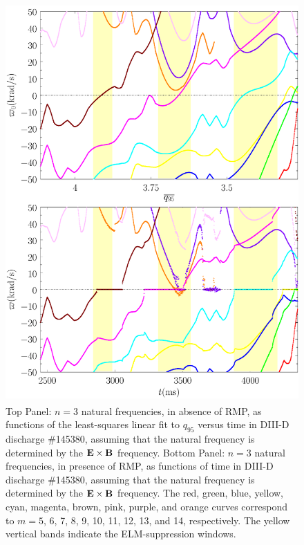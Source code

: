 \documentclass[12pt,prb,aps]{revtex4-1}
\begin{document}
\begin{figure}
\includegraphics[height=6in]{fig8.pdf}
\caption{Top Panel: $n=3$ natural frequencies, in absence of RMP, as functions of the least-squares linear fit to $q_{95}$ versus time
in   DIII-D discharge \#145380, assuming that the natural frequency is determined by the ${\bf E}\times {\bf B}$
frequency.
Bottom Panel:  $n=3$ natural frequencies, in presence of RMP, as functions of time
in   DIII-D discharge \#145380, assuming that the natural frequency is  determined by the ${\bf E}\times {\bf B}$
frequency. The red, green, blue, yellow, cyan, magenta, brown, pink,
purple, and orange  curves correspond to $m=5$, 6, 7, 8, 9, 10, 11, 12, 13, and 14, respectively. The yellow vertical bands indicate the ELM-suppression windows.} \label{fig8}
\end{figure}
\end{document}
